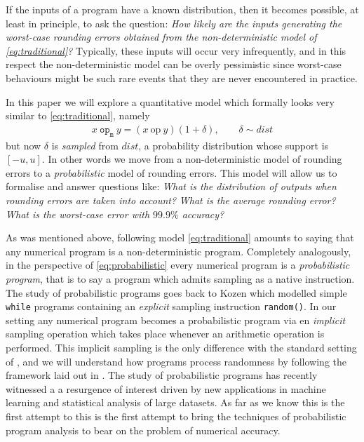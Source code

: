 \documentclass[10pt,conference]{IEEEtran}
\newcommand{\mop}{~\mathtt{op_m}~}
\newcommand{\iop}{~\mathrm{op}~}
\begin{document}
If the inputs of a program have a known distribution, then it becomes possible, at least in principle, to ask the question: \textit{How likely are the inputs generating the worst-case rounding errors obtained from the non-deterministic model of \cref{eq:traditional}?} Typically, these inputs will occur very infrequently, and in this respect the non-deterministic model can be overly pessimistic since worst-case behaviours might be such rare events that they are never encountered in practice. 

In this paper we will explore a quantitative model which formally looks very similar to \cref{eq:traditional}, namely
\begin{align}
x\mop y=(x\iop y)(1+\delta), \qquad\delta\sim dist \label{eq:probabilistic}
\end{align}
but now $\delta$ is \emph{sampled} from $dist$, a probability distribution whose support is $\left[-u,u\right]$. In other words we move from a non-deterministic model of rounding errors to a \emph{probabilistic} model of rounding errors. This model will allow us to formalise and answer questions like: \textit{What is the distribution of outputs when rounding errors are taken into account?} \textit{What is the average rounding error?} \textit{What is the worst-case error with $99.9\%$ accuracy?}

As was mentioned above, following model \eqref{eq:traditional} amounts to saying that any numerical program is a non-deterministic program. Completely analogously, in the perspective of \cref{eq:probabilistic} every numerical program is a \emph{probabilistic program}, that is to say a program which admits sampling as a native instruction. The study of probabilistic programs goes back to Kozen \cite{K81c} which modelled simple \texttt{while} programs containing an \emph{explicit} sampling instruction \texttt{random()}. In our setting any numerical program becomes a probabilistic program via en \emph{implicit} sampling operation which takes place whenever an arithmetic operation is performed. This implicit sampling is the only difference with the standard setting of \cite{K81c}, and we will understand how programs process randomness by following the framework laid out in \cite{K81c}. The study of probabilistic programs has recently witnessed a a resurgence of interest driven by new applications in machine learning and statistical analysis of large datasets. As far as we know this is the first attempt to this is the first attempt to bring the techniques of probabilistic program analysis to bear on the problem of numerical accuracy.
\end{document}
